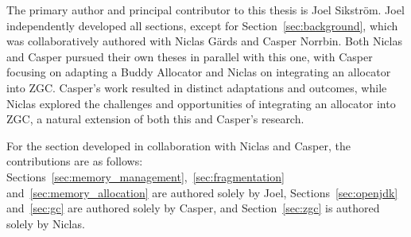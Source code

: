 
The primary author and principal contributor to this thesis is Joel Sikström. Joel independently developed all sections, except for Section~\ref{sec:background}, which was collaboratively authored with Niclas Gärds and Casper Norrbin. Both Niclas and Casper pursued their own theses in parallel with this one, with Casper focusing on adapting a Buddy Allocator and Niclas on integrating an allocator into ZGC. Casper's work resulted in distinct adaptations and outcomes, while Niclas explored the challenges and opportunities of integrating an allocator into ZGC, a natural extension of both this and Casper's research.

For the section developed in collaboration with Niclas and Casper, the contributions are as follows: Sections~\ref{sec:memory_management},~\ref{sec:fragmentation} and~\ref{sec:memory_allocation} are authored solely by Joel, Sections~\ref{sec:openjdk} and~\ref{sec:gc} are authored solely by Casper, and Section~\ref{sec:zgc} is authored solely by Niclas.

